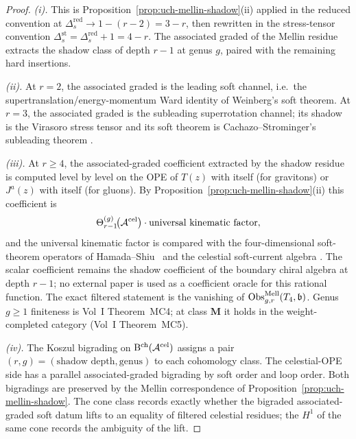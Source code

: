 \begin{proof}
\emph{(i).}
This is Proposition~\ref{prop:uch-mellin-shadow}(ii) applied in the
reduced convention at
$\Delta_s^{\mathrm{red}}\to 1-(r-2)=3-r$, then rewritten in the
stress-tensor convention
$\Delta_s^{\mathrm{st}}=\Delta_s^{\mathrm{red}}+1=4-r$. The
associated graded of the Mellin residue extracts the shadow class of
depth $r-1$ at genus $g$, paired with the remaining hard insertions.

\emph{(ii).}
At \(r=2\), the associated graded is the leading soft channel, i.e.\
the supertranslation/energy-momentum Ward identity of Weinberg's soft
theorem. At \(r=3\), the associated graded is the subleading
superrotation channel; its shadow is the Virasoro stress tensor and
its soft theorem is Cachazo--Strominger's subleading theorem
\cite{CachazoStrominger14,StromingerLectures2018}.

\emph{(iii).}
At $r \geq 4$, the associated-graded coefficient extracted by the
shadow residue is computed level by level on the OPE of $T(z)$ with
itself (for gravitons) or $J^a(z)$ with itself (for gluons). By
Proposition~\ref{prop:uch-mellin-shadow}(ii) this coefficient is
\[
\Theta_{r-1}^{(g)}\!\bigl(\mathcal A^{\mathrm{cel}}\bigr)
\cdot
\text{universal kinematic factor},
\]
and the universal kinematic factor is compared with the
four-dimensional soft-theorem operators of
Hamada--Shiu~\cite{HamadaShiuSubsubSoft} and the celestial
soft-current algebra
\cite{GuevaraHimwichPateStrominger21,StromingerWInfinityCelestial}.
The scalar coefficient remains the shadow coefficient of the boundary
chiral algebra at depth \(r-1\); no external paper is used as a
coefficient oracle for this rational function. The exact filtered
statement is the vanishing
of $\operatorname{Obs}^{\mathrm{Mell}}_{g,r}(T_4,\mathfrak b)$. Genus
$g \geq 1$ finiteness is Vol~I Theorem~MC4; at class $\mathbf M$ it
holds in the weight-completed category (Vol~I Theorem~MC5).

\emph{(iv).}
The Koszul bigrading on $\mathrm B^{\mathrm{ch}}(\mathcal A^{\mathrm{cel}})$ assigns a pair
$(r, g) = (\text{shadow depth}, \text{genus})$ to each cohomology
class. The celestial-OPE side has a parallel associated-graded
bigrading by soft order and loop order. Both bigradings are preserved
by the Mellin correspondence of Proposition~\ref{prop:uch-mellin-shadow}.
The cone class records exactly whether the bigraded associated-graded
soft datum lifts to an equality of filtered celestial residues; the
$H^1$ of the same cone records the ambiguity of the lift.
\end{proof}

